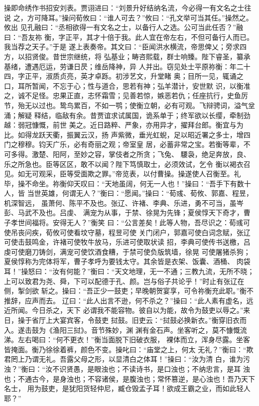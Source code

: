 操即命绣作书招安刘表。贾诩进曰：“刘景升好结纳名流，今必得一有文名之士往说
之，方可降耳。”操问荀攸曰：“谁人可去？”攸曰：“孔文举可当其任。”操然之。攸出
见孔融曰：“丞相欲得一有文名之士，以备行人之选。公可当此任否？”融曰：“吾友祢
衡，字正平，其才十倍于我。此人宜在帝左右，不但可备行人而已。我当荐之天子。”于是
遂上表奏帝。其文曰：“臣闻洪水横流，帝思俾乂；旁求四方，以招贤俊。昔世宗继统，将
弘基业；畴咨熙载，群士响臻。陛下睿圣，纂承基绪，遭遇厄运，劳谦日昃；维岳降神，异
人并出。窃见处士平原祢衡：年二十四，字正平，淑质贞亮，英才卓跞。初涉艺文，升堂睹
奥；目所一见，辄诵之口，耳所暂闻，不忘于心；性与道合，思若有神；弘羊潜计，安世默
识，以衡准之，诚不足怪。忠果正直，志怀霜雪；见善若惊，嫉恶若仇；任座抗行，史鱼厉
节，殆无以过也。鸷鸟累百，不如一鹗；使衡立朝，必有可观。飞辩骋词，溢气坌涌；解疑
释结，临敌有余。昔贾谊求试属国，诡系单于；终军欲以长缨，牵制劲越：弱冠慷慨，前世
美之。近日路粹、严象，亦用异才，擢拜台郎。衡宜与为比。如得龙跃天衢，振翼云汉，扬
声紫微，垂光虹蜺，足以昭近署之多士，增四门之穆穆。钧天广乐，必有奇丽之观；帝室皇
居，必蓄非常之宝。若衡等辈，不可多得。激楚、阳阿，至妙之容，掌伎者之所贪；飞兔、
騕袅，绝足奔放，良、乐之所急也。臣等区区，敢不以闻？陛下笃慎取士，必须效试，乞令
衡以褐衣召见。如无可观采，臣等受面欺之罪。”帝览表，以付曹操。操遂使人召衡至。礼
毕，操不命坐。祢衡仰天叹曰：“天地虽阔，何无一人也！”操曰：“吾手下有数十人，皆
当世英雄，何谓无人？”衡曰：“愿闻。”操曰：“荀彧、荀攸、郭嘉、程昱，机深智远，
虽萧何、陈平不及也。张辽、许褚、李典、乐进，勇不可当，虽岑彭、马武不及也。吕虔、
满宠为从事，于禁、徐晃为先锋；夏侯惇天下奇才，曹子孝世间福将。安得无人？”衡笑
曰：“公言差矣！此等人物，吾尽识之：荀彧可使吊丧问疾，荀攸可使看坟守墓，程昱可使
关门闭户，郭嘉可使白词念赋，张辽可使击鼓鸣金，许褚可使牧牛放马，乐进可使取状读
招，李典可使传书送檄，吕虔可使磨刀铸剑，满宠可使饮酒食糟，于禁可使负版筑墙，徐晃
可使屠猪杀狗；夏侯惇称为完体将军，曹子孝呼为要钱太守。其余皆是衣架、饭囊、酒桶、
肉袋耳！”操怒曰：“汝有何能？”衡曰：“天文地理，无一不通；三教九流，无所不晓；
上可以致君为尧、舜，下可以配德于孔、颜。岂与俗子共论乎！”时止有张辽在侧，掣剑欲
斩之。操曰：“吾正少一鼓吏；早晚朝贺宴享，可令祢衡充此职。”衡不推辞，应声而去。
辽曰：“此人出言不逊，何不杀之？”操曰：“此人素有虚名，远近所闻。今日杀之，天下
必谓我不能容物。彼自以为能，故令为鼓吏以辱之。”来日，操于省厅上大宴宾客，令鼓吏
挝鼓。旧吏云：“挝鼓必换新衣。”衡穿旧衣而入。遂击鼓为《渔阳三挝》。音节殊妙，渊
渊有金石声。坐客听之，莫不慷慨流涕。左右喝曰：“何不更衣！”衡当面脱下旧破衣服，
裸体而立，浑身尽露。坐客皆掩面。衡乃徐徐着裤，颜色不变。操叱曰：“庙堂之上，何太
无礼？”衡曰：“欺君罔上乃谓无礼。吾露父母之形，以显清白之体耳！”操曰：“汝为清
白，谁为污浊？”衡曰：“汝不识贤愚，是眼浊也；不读诗书，是口浊也；不纳忠言，是耳
浊也；不通古今，是身浊也；不容诸侯，是腹浊也；常怀篡逆，是心浊也！吾乃天下名士，
用为鼓吏，是犹阳货轻仲尼，臧仓毁孟子耳！欲成王霸之业，而如此轻人耶？”

